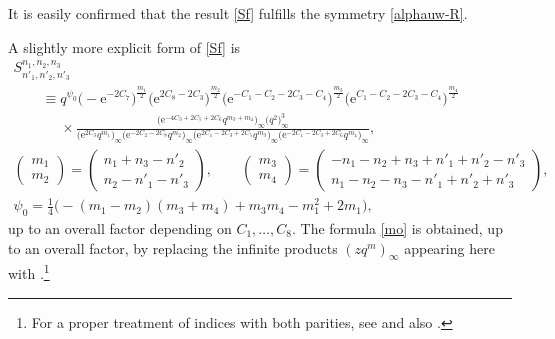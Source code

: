 \documentclass[pdftex]{sigma}
\newcommand{\e}{{\mathrm e}}
\numberwithin{equation}{section}
\begin{document}
It is easily confirmed that the result \eqref{Sf} fulfills the symmetry \eqref{alphauw-R}.

A slightly more explicit form of \eqref{Sf} is
\begin{gather}
S^{n_1,n_2, n_3}_{n'_1, n'_2, n'_3} \nonumber\\
\qquad\equiv q^{\psi_0}
\bigl(-\e^{-2C_7}\bigr)^{\frac{m_1}{2}}
\bigl(\e^{2C_8-2C_3}\bigr)^{\frac{m_2}{2}}
\bigl(\e^{-C_1-C_2-2C_3-C_4}\bigr)^{\frac{m_3}{2}}
\bigl(\e^{C_1-C_2-2C_3-C_4}\bigr)^{\frac{m_4}{2}}
\nonumber\\
\phantom{\qquad\equiv}{} \times
\frac{\bigl(\e^{-4C_3+2C_5+2C_6}q^{m_3+m_4}\bigr)_\infty\bigl(q^2\bigr)^3_\infty}
{\bigl(\e^{2C_3}q^{m_1}\bigr)_\infty
\bigl(\e^{-2C_2-2C_8}q^{m_2}\bigr)_\infty
\bigl(\e^{2C_1-2C_3+2C_5}q^{m_3}\bigr)_\infty
\bigl(\e^{-2C_1-2C_3+2C_6}q^{m_4}\bigr)_\infty},
\label{Sf2}\\
\begin{pmatrix}m_1 \\ m_2\end{pmatrix} =
\begin{pmatrix}n_1+n_3-n'_2 \\ n_2-n'_1-n'_3 \end{pmatrix},
\qquad
\begin{pmatrix}m_3 \\ m_4\end{pmatrix} =
\begin{pmatrix}-n_1-n_2+n_3+n'_1+n'_2-n'_3 \\ n_1-n_2-n_3-n'_1+n'_2+n'_3 \end{pmatrix},
\label{mdef}
\\
\psi_0 = \frac{1}{4}\bigl(-(m_1-m_2)(m_3+m_4)+m_3m_4-m_1^2+2m_1\bigr),
\label{p0def}
\end{gather}
up to an overall factor depending on $C_1, \dots, C_8$. The formula
\eqref{mo} is obtained, up to an overall factor, by replacing the
infinite products $(zq^m)_\infty$ appearing here with
.\footnote{For a proper
 treatment of indices with both parities, see \cite[equation~(49)]{KMY23}
 and also \cite[Proposition~2]{KMY23}.}
\end{document}

